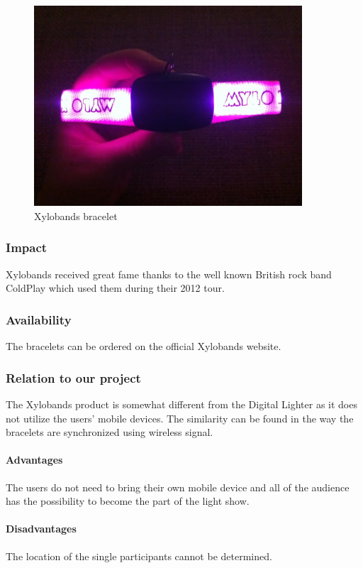 \begin{figure}[!t]
	\centering
		\includegraphics[width=10cm]{preliminaryStudies/xylo.jpg}
	\caption{Xylobands bracelet}
	\label{fig:xylo}
\end{figure}

\subsubsection{Impact}
Xylobands received great fame thanks to the well known British rock band ColdPlay which used them during their 2012 tour.

\subsubsection{Availability}
The bracelets can be ordered on the official Xylobands website.

\subsubsection{Relation to our project}
The Xylobands product is somewhat different from the Digital Lighter as it does not utilize the users' mobile devices. 
The similarity can be found in the way the bracelets are synchronized using wireless signal. 

\paragraph{Advantages}
The users do not need to bring their own mobile device and all of the audience has the possibility to become the part of the light show.

\paragraph{Disadvantages}
The location of the single participants cannot be determined.

